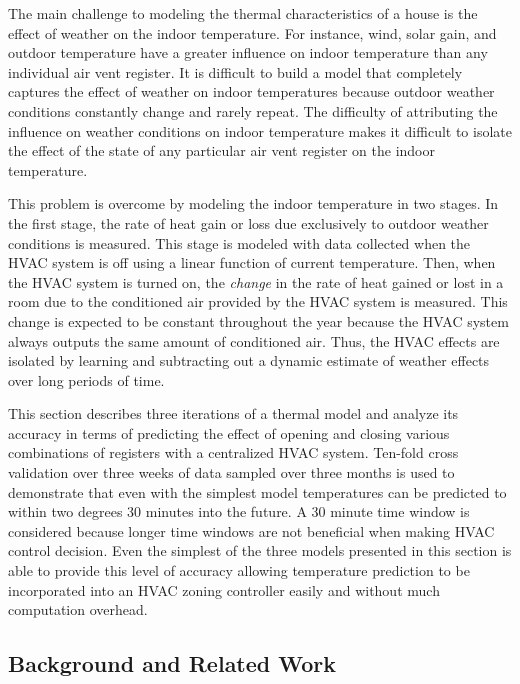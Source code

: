 The main challenge to modeling the thermal characteristics of a house is
the effect of weather on the indoor temperature. For instance, wind, solar gain,
and outdoor temperature have a greater influence on indoor temperature than any
individual air vent register. It is difficult to build a model that completely
captures the effect of weather on indoor temperatures because outdoor weather
conditions constantly change and rarely repeat. The difficulty of attributing
the influence on weather conditions on indoor temperature makes it difficult to
isolate the effect of the state of any particular air vent register on the
indoor temperature.

This problem is overcome by modeling the indoor temperature in two stages. In
the first stage, the rate of heat gain or loss due exclusively to outdoor
weather conditions is measured. This stage is modeled with data collected when
the HVAC system is off using a linear function of current temperature. Then,
when the HVAC system is turned on, the {\em change} in the rate of heat gained
or lost in a room due to the conditioned air provided by the HVAC system is
measured. This change is expected to be constant throughout the year because the
HVAC system always outputs the same amount of conditioned air. Thus, the HVAC
effects are isolated by learning and subtracting out a dynamic estimate of
weather effects over long periods of time.

This section describes three iterations of a thermal model and analyze its
accuracy in terms of predicting the effect of opening and closing various
combinations of registers with a centralized HVAC system. Ten-fold cross
validation over three weeks of data sampled over three months is used to
demonstrate that even with the simplest model temperatures can be predicted to
within two degrees 30 minutes into the future. A 30 minute time window is
considered because longer time windows are not beneficial when making HVAC
control decision. Even the simplest of the three models presented in this
section is able to provide this level of accuracy allowing temperature
prediction to be incorporated into an HVAC zoning controller easily and without
much computation overhead.

\subsection{Background and Related Work}
\label{sec:thermalBackground}


